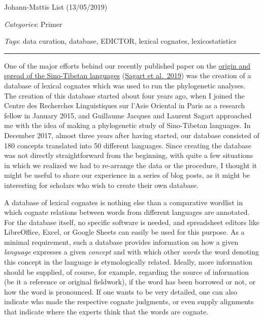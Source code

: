 \documentclass[
  a4paper,
  14pt,
  oneside,
  tablecaptionabove
]{scrbook}
\begin{document}
Johann-Mattis List (13/05/2019)

\emph{Categories}: Primer

\emph{Tags}: data curation, database, EDICTOR, lexical cognates,
lexicostatistics

\begin{center}\rule{0.5\linewidth}{1pt}\end{center}


One of the major efforts behind our recently published paper on the
\href{https://www.pnas.org/content/early/2019/04/30/1817972116}{origin
and spread of the Sino-Tibetan languages} (\href{http://bibliography.lingpy.org?key=Sagart2019}{Sagart et al.~2019}) was the creation of a database of lexical cognates which was used to
run the phylogenetic analyses. The creation of this database started
about four years ago, when I joined the Centre des Recherches
Linguistiques sur l'Asie Oriental in Paris as a research fellow in
January 2015, and Guillaume Jacques and Laurent Sagart approached me
with the idea of making a phylogenetic study of Sino-Tibetan languages.
In December 2017, almost three years after having started, our database
consisted of 180 concepts translated into 50 different languages. Since
creating the database was not directly straightforward from the
beginning, with quite a few situations in which we realized we had to
re-arrange the data or the procedure, I thought it might be useful to
share our experience in a series of blog posts, as it might be
interesting for scholars who wish to create their own database.

A database of lexical cognates is nothing else than a comparative
wordlist in which cognate relations between words from different
languages are annotated. For the database itself, no specific software
is needed, and spreadsheet editors like LibreOffice, Excel, or Google
Sheets can easily be used for this purpose. As a minimal requirement,
such a database provides information on how a given \emph{language}
expresses a given \emph{concept} and with which other \emph{words} the
word denoting this concept in the language is etymologically related.
Ideally, more information should be supplied, of course, for example,
regarding the source of information (be it a reference or original
fieldwork), if the word has been borrowed or not, or how the word is
pronounced. If one wants to be very detailed, one can also indicate who
made the respective cognate judgments, or even supply alignments that
indicate where the experts think that the words are cognate.
\end{document}
